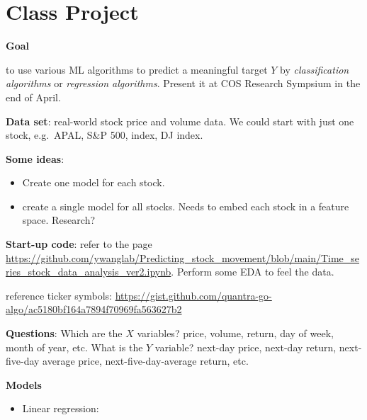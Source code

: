 \documentclass[
  letterpaper,
  DIV=11,
  numbers=noendperiod]{scrreprt}
\providecommand{\tightlist}{%
  \setlength{\itemsep}{0pt}\setlength{\parskip}{0pt}}\usepackage{longtable,booktabs,array}
\begin{document}
{{

\chapter{Class Project}\label{class-project}

\textbf{Goal}

to use various ML algorithms to predict a meaningful target \(Y\) by
\emph{classification algorithms} or \emph{regression algorithms}.
Present it at COS Research Sympsium in the end of April.

\textbf{Data set}: real-world stock price and volume data. We could
start with just one stock, e.g.~APAL, S\&P 500, index, DJ index.

\textbf{Some ideas}:

\begin{itemize}
\tightlist
\item
  Create one model for each stock.
\item
  create a single model for all stocks. Needs to embed each stock in a
  feature space. Research?
\end{itemize}

\textbf{Start-up code}: refer to the page
\url{https://github.com/ywanglab/Predicting_stock_movement/blob/main/Time_series_stock_data_analysis_ver2.ipynb}.
Perform some EDA to feel the data.

reference ticker symbols:
\url{https://gist.github.com/quantra-go-algo/ac5180bf164a7894f70969fa563627b2}

\textbf{Questions}: Which are the \(X\) variables? price, volume,
return, day of week, month of year, etc. What is the \(Y\) variable?
next-day price, next-day return, next-five-day average price,
next-five-day-average return, etc.

\textbf{Models}

\begin{itemize}
\item
  Linear regression:


\end{itemize}}}
\end{document}
